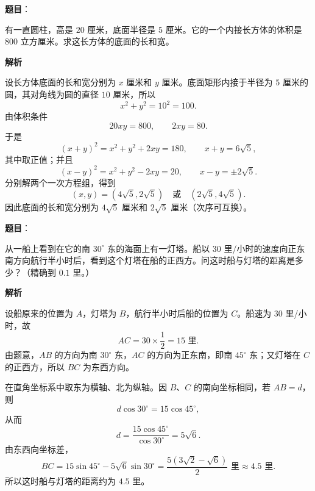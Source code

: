 \begin{answer}

\textbf{题目}：

有一直圆柱，高是 $20$ 厘米，底面半径是 $5$ 厘米。它的一个内接长方体的体积是 $800$ 立方厘米。求这长方体的底面的长和宽。

\textbf{解析}

设长方体底面的长和宽分别为 $x$ 厘米和 $y$ 厘米。底面矩形内接于半径为 $5$ 厘米的圆，其对角线为圆的直径 $10$ 厘米，所以
\nopagebreak[4]
\[
x^2+y^2=10^2=100.
\]
由体积条件
\nopagebreak[4]
\[
20xy=800,
\qquad 2xy=80.
\]
于是
\nopagebreak[4]
\[
(x+y)^2=x^2+y^2+2xy=180,
\qquad x+y=6\sqrt5,
\]
其中取正值；并且
\nopagebreak[4]
\[
(x-y)^2=x^2+y^2-2xy=20,
\qquad x-y=\pm2\sqrt5.
\]
分别解两个一次方程组，得到
\nopagebreak[4]
\[
(x,y)=(4\sqrt5,2\sqrt5)\quad\text{或}\quad(2\sqrt5,4\sqrt5).
\]
因此底面的长和宽分别为 $4\sqrt5$ 厘米和 $2\sqrt5$ 厘米（次序可互换）。


\end{answer}
\begin{answer}

\textbf{题目}：

从一船上看到在它的南 $30^\circ$ 东的海面上有一灯塔。船以 $30$ 里/小时的速度向正东南方向航行半小时后，看到这个灯塔在船的正西方。问这时船与灯塔的距离是多少？（精确到 $0.1$ 里。）

\textbf{解析}
\nopagebreak[4]
\begin{center}\end{center}
\nopagebreak[4]
设船原来的位置为 $A$，灯塔为 $B$，航行半小时后船的位置为 $C$。船速为 $30$ 里/小时，故
\nopagebreak[4]
\[
AC=30\times\frac12=15\text{ 里}.
\]
由题意，$AB$ 的方向为南 $30^\circ$ 东，$AC$ 的方向为正东南，即南 $45^\circ$ 东；又灯塔在 $C$ 的正西方，所以 $BC$ 为东西方向。

在直角坐标系中取东为横轴、北为纵轴。因 $B$、$C$ 的南向坐标相同，若 $AB=d$，则
\nopagebreak[4]
\[
d\cos30^\circ=15\cos45^\circ,
\]
从而
\nopagebreak[4]
\[
d=\frac{15\cos45^\circ}{\cos30^\circ}=5\sqrt6.
\]
由东西向坐标差，
\nopagebreak[4]
\[
BC=15\sin45^\circ-5\sqrt6\sin30^\circ
 =\frac{5(3\sqrt2-\sqrt6)}{2}\text{ 里}
 \approx4.5\text{ 里}.
\]
所以这时船与灯塔的距离约为 $4.5$ 里。


\end{answer}
